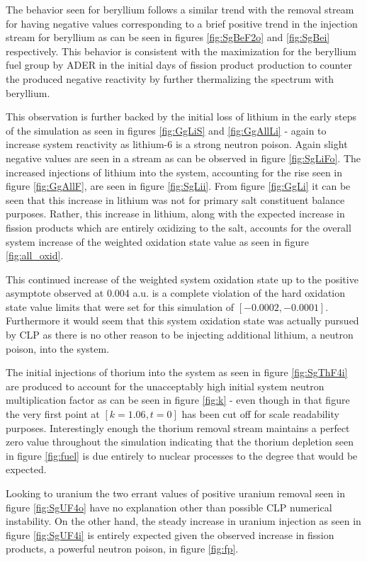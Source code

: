The behavior seen for beryllium follows a similar trend with the removal stream
for  having negative values corresponding to a brief positive trend
in the injection stream for beryllium as can be seen in figures
\ref{fig:SgBeF2o} and \ref{fig:SgBei} respectively. This behavior is consistent
with the maximization for the beryllium fuel group by ADER in the initial days
of fission product production to counter the produced negative reactivity by
further thermalizing the spectrum with beryllium. 

This observation is further backed by the initial loss of lithium in the
early steps of the simulation as seen in figures \ref{fig:GgLiS} and 
\ref{fig:GgAllLi} - again to increase system reactivity as lithium-6 is a
strong neutron poison. Again slight negative values are seen in a stream as can
be observed in figure \ref{fig:SgLiFo}. The increased injections of lithium 
into the system, accounting for the rise seen in figure \ref{fig:GgAllF}, are
seen in figure \ref{fig:SgLii}. From figure \ref{fig:GgLi} it can be seen that
this increase in lithium was not for primary salt constituent balance purposes.
Rather, this increase in lithium, along with the expected increase in fission
products which are entirely oxidizing to the salt, accounts for the overall
system increase of the weighted oxidation state value as seen in figure
\ref{fig:all_oxid}.

This continued increase of the weighted system oxidation state up to the
positive asymptote observed at 0.004 a.u. is a complete violation of the 
hard oxidation state value limits that were set for this simulation of 
$[-0.0002, -0.0001]$. Furthermore it would seem that this system oxidation
state was actually pursued by CLP as there is no other reason to be injecting
additional lithium, a neutron poison, into the system.

The initial injections of thorium into the system as seen in figure
\ref{fig:SgThF4i} are produced to account for the unacceptably high 
initial system neutron multiplication factor as can be seen in figure
\ref{fig:k} - even though in that figure the very first point at $[k=1.06,t=0]$
has been cut off for scale readability purposes. Interestingly enough the
thorium removal stream maintains a perfect zero value throughout 
the simulation indicating that the thorium depletion seen in figure
\ref{fig:fuel} is due entirely to nuclear processes to the degree that would be
expected.

Looking to uranium the two errant values of positive uranium removal seen in
figure \ref{fig:SgUF4o} have no explanation other than possible CLP numerical
instability. On the other hand, the steady increase in uranium injection
as seen in figure \ref{fig:SgUF4i} is entirely expected given the observed
increase in fission products, a powerful neutron poison, in figure \ref{fig:fp}.

